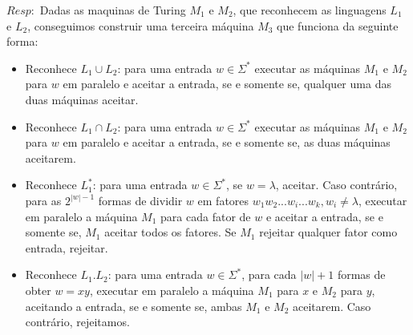 \documentclass{homework}
\begin{document}
	$Resp:$ Dadas as maquinas de Turing $M_1$ e $M_2$, que reconhecem as linguagens $L_1$ e $L_2$, conseguimos construir uma terceira máquina $M_3$ que funciona da seguinte forma:
	\begin{itemize}
		\item Reconhece $L_1 \cup L_2$: para uma entrada $w \in \Sigma^*$ executar as máquinas $M_1$ e $M_2$ para $w$ em paralelo e aceitar a entrada, se e somente se, qualquer uma das duas máquinas aceitar.
		\item Reconhece $L_1 \cap L_2$: para uma entrada $w \in \Sigma^*$ executar as máquinas $M_1$ e $M_2$ para $w$ em paralelo e aceitar a entrada, se e somente se, as duas máquinas aceitarem.
		\item Reconhece $L_1^*$: para uma entrada $w \in \Sigma^*$, se $w = \lambda$, aceitar. Caso contrário, para as $2^{|w|-1}$ formas de dividir $w$ em fatores $w_1w_2...w_i...w_k, w_i \neq \lambda$, executar em paralelo a máquina $M_1$ para cada fator de $w$ e aceitar a entrada, se e somente se, $M_1$ aceitar todos os fatores. Se $M_1$ rejeitar qualquer fator como entrada, rejeitar.
		\item Reconhece $L_1.L_2$: para uma entrada $w \in \Sigma^*$, para cada $|w| + 1$ formas de obter $w = xy$, executar em paralelo a máquina $M_1$ para $x$ e $M_2$ para $y$, aceitando a entrada, se e somente se, ambas $M_1$ e $M_2$ aceitarem. Caso contrário, rejeitamos.
	\end{itemize}
\end{document}
